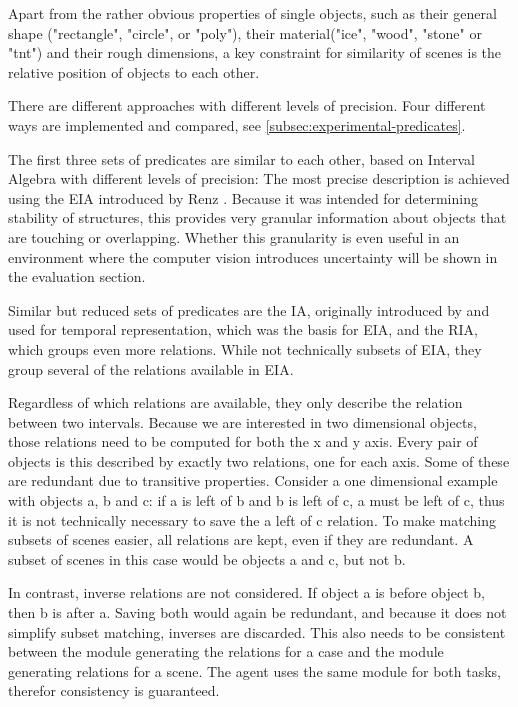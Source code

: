 Apart from the rather obvious properties of single objects, such as their general shape ("rectangle", "circle", or "poly"), their material("ice", "wood", "stone" or "tnt") and their rough dimensions, a key constraint for similarity of scenes is the relative position of objects to each other.

There are different approaches with different levels of precision. Four different ways are implemented and compared, see \ref{subsec:experimental-predicates}.

The first three sets of predicates are similar to each other, based on Interval Algebra with different levels of precision:
The most precise description is achieved using the \ac{EIA} introduced by Renz \cite{Renz-ERA}. Because it was intended for determining stability of structures, this provides very granular information about objects that are touching or overlapping.
Whether this granularity is even useful in an environment where the computer vision introduces uncertainty will be shown in the evaluation section.

Similar but reduced sets of predicates are the \ac{IA}, originally introduced by \cite{Allen-10.1145/182.358434} and used for temporal representation, which was the basis for \ac{EIA}, and the \ac{RIA}, which groups even more relations. While not technically subsets of EIA, they group several of the relations available in EIA.



Regardless of which relations are available, they only describe the relation between two intervals. Because we are interested in two dimensional objects, those relations need to be computed for both the x and y axis. Every pair of objects is this described by exactly two relations, one for each axis. Some of these are redundant due to transitive properties.
Consider a one dimensional example with objects a, b and c: if a is left of b and b is left of c, a must be left of c, thus it is not technically necessary to save the a left of c relation.
To make matching subsets of scenes easier, all relations are kept, even if they are redundant. A subset of scenes in this case would be objects a and c, but not b.

In contrast, inverse relations are not considered. If object a is before object b, then b is after a. Saving both would again be redundant, and because it does not simplify subset matching, inverses are discarded. This also needs to be consistent between the module generating the relations for a case and the module generating relations for a scene. The agent uses the same module for both tasks, therefor consistency is guaranteed.

